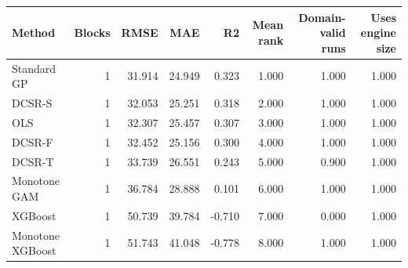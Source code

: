 \begin{tabular}{lrrrrrrr}
\toprule
Method & Blocks & RMSE & MAE & R2 & Mean rank & Domain-valid runs & Uses engine size \\
\midrule
Standard GP & 1 & 31.914 & 24.949 & 0.323 & 1.000 & 1.000 & 1.000 \\
DCSR-S & 1 & 32.053 & 25.251 & 0.318 & 2.000 & 1.000 & 1.000 \\
OLS & 1 & 32.307 & 25.457 & 0.307 & 3.000 & 1.000 & 1.000 \\
DCSR-F & 1 & 32.452 & 25.156 & 0.300 & 4.000 & 1.000 & 1.000 \\
DCSR-T & 1 & 33.739 & 26.551 & 0.243 & 5.000 & 0.900 & 1.000 \\
Monotone GAM & 1 & 36.784 & 28.888 & 0.101 & 6.000 & 1.000 & 1.000 \\
XGBoost & 1 & 50.739 & 39.784 & -0.710 & 7.000 & 0.000 & 1.000 \\
Monotone XGBoost & 1 & 51.743 & 41.048 & -0.778 & 8.000 & 1.000 & 1.000 \\
\bottomrule
\end{tabular}
